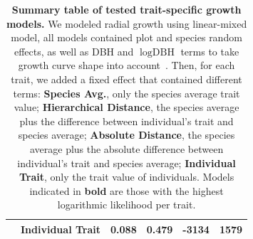 \begin{table}[!t]
\begin{center}
\begin{tabular}{llcccc}
		            & Individual Trait & 0.088 & 0.479 & -3134 & 1579 \\ 
		   \hline
		   \hline
		\end{tabular}
		\caption{\textbf{Summary table of tested trait-specific growth models.} We modeled radial growth using linear-mixed model, all models contained plot and species random effects, as well as DBH and $\log\text{DBH}$ terms to take growth curve shape into account~\citep{herault_functional_2011}. Then, for each trait, we added a fixed effect that contained different terms: \textbf{Species Avg.}, only the species average trait value; \textbf{Hierarchical Distance}, the species average plus the difference between individual's trait and species average; \textbf{Absolute Distance}, the species average plus the absolute difference between individual's trait and species average; \textbf{Individual Trait}, only the trait value of individuals. Models indicated in \textbf{bold} are those with the highest logarithmic likelihood per trait.}
		\label{tab:growth_mod}
	\end{center}
\end{table}

